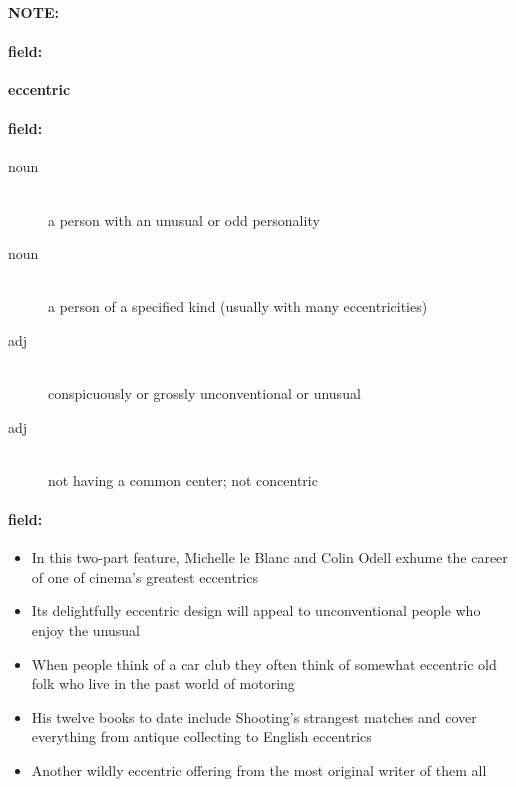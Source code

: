\documentclass[12pt]{article}
\newenvironment{note}{\paragraph{NOTE:}}{}
\newenvironment{field}{\paragraph{field:}}{}
\begin{document}
\begin{note}
\begin{field}
\textbf{\large eccentric}
\end{field}


\begin{field}
\begin{description}
\item[noun] \hfill \\ 
a person with an unusual or odd personality

\item[noun] \hfill \\ 
a person of a specified kind (usually with many eccentricities)

\item[adj] \hfill \\ 
conspicuously or grossly unconventional or unusual

\item[adj] \hfill \\ 
not having a common center; not concentric

\end{description}
\end{field}

\begin{field}
\begin{itemize}
\item In this two-part feature, Michelle le Blanc and Colin Odell exhume the career of one of cinema's greatest eccentrics
\item Its delightfully eccentric design will appeal to unconventional people who enjoy the unusual
\item When people think of a car club they often think of somewhat eccentric old folk who live in the past world of motoring
\item His twelve books to date include Shooting's strangest matches and cover everything from antique collecting to English eccentrics
\item Another wildly eccentric offering from the most original writer of them all
\end{itemize}
\end{field}
\end{note}
\end{document}
